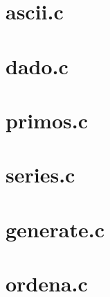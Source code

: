 \documentclass{book}
\begin{document}



\section{ascii.c}




\section{dado.c}




\section{primos.c}




\section{series.c}







\section{generate.c}




\section{ordena.c}
\end{document}
